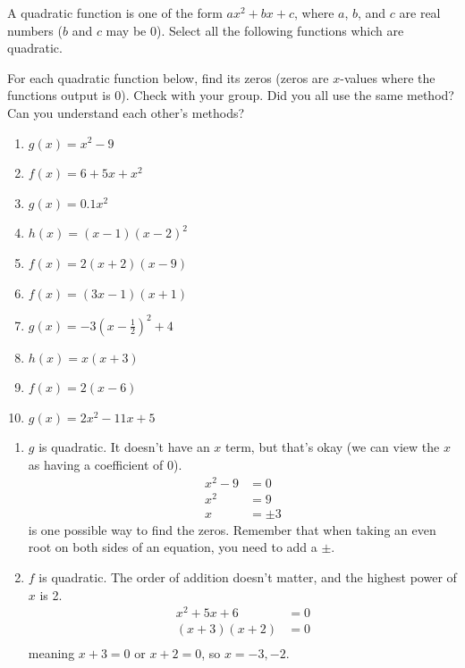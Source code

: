 \documentclass[noauthor]{ximera}
\begin{document}
\begin{problem}
A quadratic function is one of the form \(ax^2 + bx + c\), where \(a\),
\(b\), and \(c\) are real numbers (\(b\) and \(c\) may be 0). Select all the 
following functions which are quadratic. 

For each quadratic function below, find its zeros (zeros are 
\(x\)-values where the functions output is 0). Check with your group.
Did you all use the same method? Can you understand each other's methods?

\begin{enumerate}
    \item \(g\left(x\right)=x^2-9\)
    \item \(f\left(x\right)=6+5x+x^2\)
    \item \(g\left(x\right)=0.1x^2\)
    \item \(h\left(x\right)=\left(x-1\right)\left(x-2\right)^2\)
    \item \(f\left(x\right)=2\left(x+2\right)\left(x-9\right)\)
    \item \(f\left(x\right)=\left(3x-1\right)\left(x+1\right)\)
    \item \(g\left(x\right)=-3\left(x-\frac{1}{2}\right)^2+4\)
    \item \(h\left(x\right)=x\left(x+3\right)\)
    \item \(f\left(x\right)=2\left(x-6\right)\)
    \item \(g\left(x\right)=2x^2-11x+5\)
\end{enumerate}

\begin{explanation}
\begin{enumerate}
    \item \(g\) is quadratic. It doesn't have an \(x\) term, but that's okay (we can view the \(x\) as having 
    a coefficient of \(0\)).
    \begin{align*}
        x^2 - 9 & = 0 \\
        x^2 & = 9 \\
        x & = \pm 3
    \end{align*}
    is one possible way to find the zeros. Remember that when taking an even
    root on both sides of an equation, you need to add a \(\pm\).

    \item \(f\) is quadratic. The order of addition doesn't matter, and the highest power of \(x\) is 2.
    \begin{align*}
        x^2 + 5x + 6 & = 0 \\
        (x + 3)(x + 2) & = 0 \\
    \end{align*}
    meaning \(x + 3 = 0\) or \(x + 2 = 0\), so \(x = -3, -2\). 
    

\end{enumerate}
\end{explanation}
\end{problem}
\end{document}
